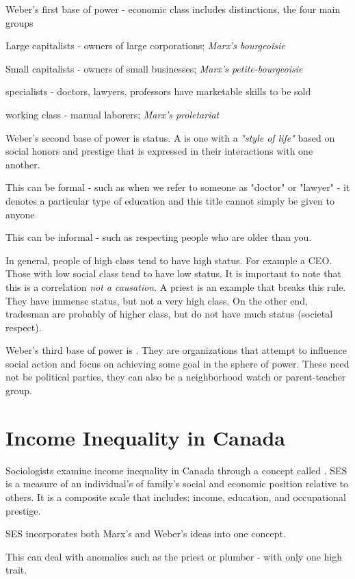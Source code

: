 Weber's first base of power - economic class includes distinctions, the four main groups\sidenote[12]{}
\begin{bullets}
	\item Large capitalists - owners of large corporations; \textit{Marx's bourgeoisie}
	\item Small capitalists - owners of small businesses; \textit{Marx's petite-bourgeoisie}
	\item specialists - doctors, lawyers, professors have marketable skills to be sold
	\item working class - manual laborers; \textit{Marx's proletariat}
\end{bullets}

Weber's second base of power is status. A  is one with a \textit{"style of life"} based on social honors and prestige that is expressed in their interactions with one another.
\begin{bullets}
	\item This can be formal - such as when we refer to someone as "doctor" or "lawyer" - it denotes a particular type of education and this title cannot simply be given to anyone
	\item This can be informal - such as respecting people who are older than you.
\end{bullets}

In general, people of high class tend to have high status. For example a CEO. Those with low social class tend to have low status. It is important to note that this is a correlation \textit{not a causation}. A priest is an example that breaks this rule. They have immense status, but not a very high class. On the other end, tradesman are probably of higher class, but do not have much status (societal respect).

Weber's third base of power is . They are organizations that attempt to influence social action and focus on achieving some goal in the sphere of power. These need not be political parties, they can also be a neighborhood watch or parent-teacher group.

\section{Income Inequality in Canada}

Sociologists examine income inequality in Canada through a concept called . SES is a measure of an individual's of family's social and economic position relative to others. It is a composite scale that includes: income, education, and occupational prestige.
\begin{bullets}
	\item SES incorporates both Marx's and Weber's ideas into one concept.
\end{bullets}
This can deal with anomalies such as the priest or plumber - with only one high trait.

